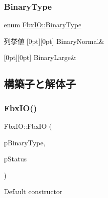 \subsubsection{\texorpdfstring{Binary\+Type}{BinaryType}}
{\footnotesize\ttfamily enum \hyperlink{class_fbx_i_o_ad0532f36367fa6b750993000dfb8ed1e}{Fbx\+I\+O\+::\+Binary\+Type}}

\begin{DoxyEnumFields}{列挙値}
[0pt][0pt]{}\mbox{\label{class_fbx_i_o_ad0532f36367fa6b750993000dfb8ed1eaf6a4bfa7cf38e5cf98cc23f8ece8c7d3}} 
Binary\+Normal&\\
\hline

[0pt][0pt]{}\mbox{\label{class_fbx_i_o_ad0532f36367fa6b750993000dfb8ed1eadc2f299bd32d8da3c25f13d70125376f}} 
Binary\+Large&\\
\hline

\end{DoxyEnumFields}


\subsection{構築子と解体子}
\mbox{\label{class_fbx_i_o_a328bf0d723833d6bd3717c7865d9b5b0}} 
\subsubsection{\texorpdfstring{Fbx\+I\+O()}{FbxIO()}}
{\footnotesize\ttfamily Fbx\+I\+O\+::\+Fbx\+IO (\begin{DoxyParamCaption}\item[{\hyperlink{class_fbx_i_o_ad0532f36367fa6b750993000dfb8ed1e}{Binary\+Type}}]{p\+Binary\+Type,  }\item[{\hyperlink{class_fbx_status}{Fbx\+Status} \&}]{p\+Status }\end{DoxyParamCaption})}

Default constructor \mbox{\label{class_fbx_i_o_a2f154dad101f0251a38f819222d01807}} 

